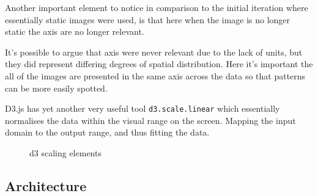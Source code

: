 \documentclass[a4paper,11pt,titlepage]{article}
\begin{document}
	
		\begin{figure}[H]
    			\centering	
    			\qquad
    			\caption{}%
    			\label{fig:epoch_layer}
	\end{figure}
	
	Another important element to notice in comparison to the initial iteration where essentially static images were used, is that here when the image is no longer static the axis are no longer relevant.
	\par 
	It's possible to argue that axis were never relevant due to the lack of units, but they did represent differing degrees of spatial distribution. Here it's important the all of the images are presented in the same axis across the data so that patterns can be more easily spotted. 
	\par 
	D3.js has yet another very useful tool \texttt{d3.scale.linear} which essentially normalises the data within the visual range on the screen. Mapping the input domain to the output range, and thus fitting the data.
	\begin{figure}[H]
    			\caption{d3 scaling elements}%
	\end{figure}	
		
	\subsection{Architecture}
	
\end{document}
